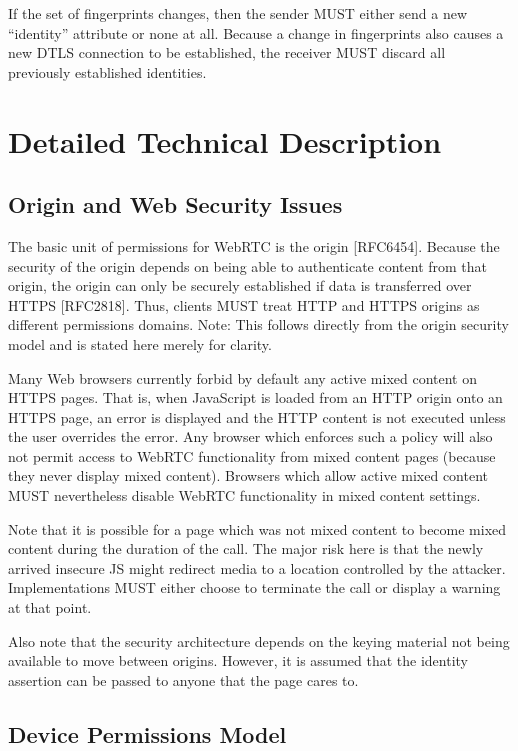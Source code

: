 \documentclass{article}
\begin{document}
If the set of fingerprints changes, then the sender MUST either send
a new ``identity'' attribute or none at all.  Because a change in
fingerprints also causes a new DTLS connection to be established, the
receiver MUST discard all previously established identities.

\section{Detailed Technical Description}

\subsection{Origin and Web Security Issues}

The basic unit of permissions for WebRTC is the origin [RFC6454].
Because the security of the origin depends on being able to
authenticate content from that origin, the origin can only be
securely established if data is transferred over HTTPS [RFC2818].
Thus, clients MUST treat HTTP and HTTPS origins as different
permissions domains.  Note: This follows directly from the origin
security model and is stated here merely for clarity.

Many Web browsers currently forbid by default any active mixed
content on HTTPS pages.  That is, when JavaScript is loaded from an
HTTP origin onto an HTTPS page, an error is displayed and the HTTP
content is not executed unless the user overrides the error.  Any
browser which enforces such a policy will also not permit access to
WebRTC functionality from mixed content pages (because they never
display mixed content).  Browsers which allow active mixed content
MUST nevertheless disable WebRTC functionality in mixed content
settings.

Note that it is possible for a page which was not mixed content to
become mixed content during the duration of the call.  The major risk
here is that the newly arrived insecure JS might redirect media to a
location controlled by the attacker.  Implementations MUST either
choose to terminate the call or display a warning at that point.

Also note that the security architecture depends on the keying
material not being available to move between origins.  However, it is
assumed that the identity assertion can be passed to anyone that the
page cares to.

\subsection{Device Permissions Model}
\end{document}
